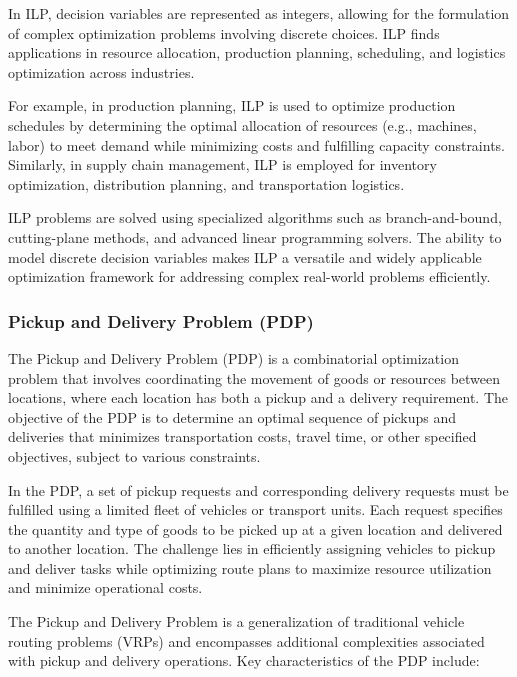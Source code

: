 \documentclass[11pt]{report}
\begin{document}
        In ILP, decision variables are represented as integers, allowing for the formulation of complex optimization problems involving discrete choices. ILP finds applications in resource allocation, production planning, scheduling, and logistics optimization across industries.
        
        For example, in production planning, ILP is used to optimize production schedules by determining the optimal allocation of resources (e.g., machines, labor) to meet demand while minimizing costs and fulfilling capacity constraints. Similarly, in supply chain management, ILP is employed for inventory optimization, distribution planning, and transportation logistics.
        
        ILP problems are solved using specialized algorithms such as branch-and-bound, cutting-plane methods, and advanced linear programming solvers. The ability to model discrete decision variables makes ILP a versatile and widely applicable optimization framework for addressing complex real-world problems efficiently.

        \subsubsection{Pickup and Delivery Problem (PDP)}

        The Pickup and Delivery Problem (PDP) is a combinatorial optimization problem that involves coordinating the movement of goods or resources between locations, where each location has both a pickup and a delivery requirement. The objective of the PDP is to determine an optimal sequence of pickups and deliveries that minimizes transportation costs, travel time, or other specified objectives, subject to various constraints.
        
        In the PDP, a set of pickup requests and corresponding delivery requests must be fulfilled using a limited fleet of vehicles or transport units. Each request specifies the quantity and type of goods to be picked up at a given location and delivered to another location. The challenge lies in efficiently assigning vehicles to pickup and deliver tasks while optimizing route plans to maximize resource utilization and minimize operational costs.
        
        The Pickup and Delivery Problem is a generalization of traditional vehicle routing problems (VRPs) and encompasses additional complexities associated with pickup and delivery operations. Key characteristics of the PDP include:
\end{document}
